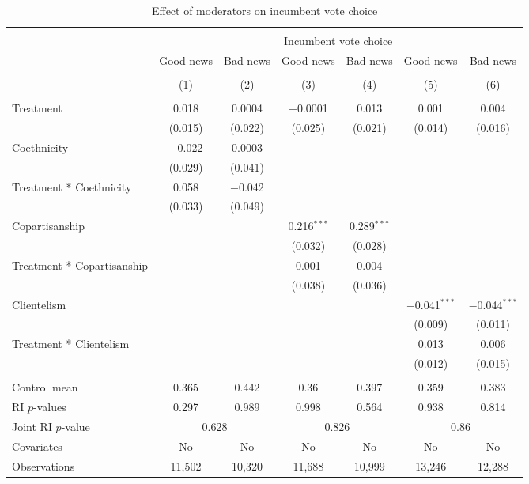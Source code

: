 
\begin{table}[!htbp] \centering 
  \caption{Effect of moderators on incumbent vote choice} 
  \label{moderators} 
\begin{tabular}{@{\extracolsep{1pt}}lcccccc} 
\\[-1.8ex]\hline 
\hline \\[-1.8ex] 
 & \multicolumn{6}{c}{Incumbent vote choice} \\ 
\cline{2-7} 
 & Good news & Bad news & Good news & Bad news & Good news & Bad news \\ 
\cline{2-7}
\\[-1.8ex] & (1) & (2) & (3) & (4) & (5) & (6)\\ 
\hline \\[-1.8ex] 
 Treatment & 0.018 & 0.0004 & $-$0.0001 & 0.013 & 0.001 & 0.004 \\ 
  & (0.015) & (0.022) & (0.025) & (0.021) & (0.014) & (0.016) \\ 
  Coethnicity & $-$0.022 & 0.0003 &  &  &  &  \\ 
  & (0.029) & (0.041) &  &  &  &  \\ 
  Treatment * Coethnicity & 0.058 & $-$0.042 &  &  &  &  \\ 
  & (0.033) & (0.049) &  &  &  &  \\ 
  Copartisanship &  &  & 0.216$^{***}$ & 0.289$^{***}$ &  &  \\ 
  &  &  & (0.032) & (0.028) &  &  \\ 
  Treatment * Copartisanship &  &  & 0.001 & 0.004 &  &  \\ 
  &  &  & (0.038) & (0.036) &  &  \\ 
  Clientelism &  &  &  &  & $-$0.041$^{***}$ & $-$0.044$^{***}$ \\ 
  &  &  &  &  & (0.009) & (0.011) \\ 
  Treatment * Clientelism &  &  &  &  & 0.013 & 0.006 \\ 
  &  &  &  &  & (0.012) & (0.015) \\ 
 \hline \\[-1.8ex] 
Control mean & 0.365 & 0.442 & 0.36 & 0.397 & 0.359 & 0.383 \\ 
RI $p$-values & 0.297 & 0.989 & 0.998 & 0.564 & 0.938 & 0.814 \\ 
Joint RI $p$-value & \multicolumn{2}{c}{0.628} & \multicolumn{2}{c}{0.826} & \multicolumn{2}{c}{0.86} \\
Covariates & No & No & No & No & No & No \\ 
Observations & 11,502 & 10,320 & 11,688 & 10,999 & 13,246 & 12,288 \\ 

\end{tabular}
\end{table}
